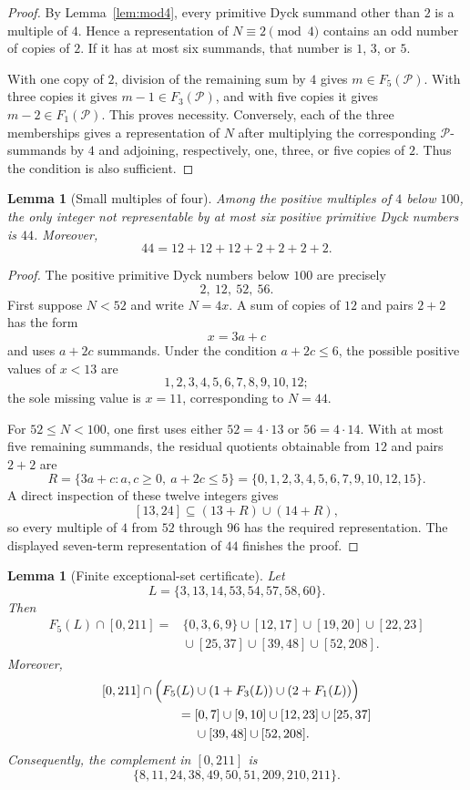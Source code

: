 \documentclass[12pt]{article}
\theoremstyle{plain}
\newtheorem{lemma}[theorem]{Lemma}
\theoremstyle{definition}
\theoremstyle{plain}
\newcommand{\Pset}{\mathcal{P}}
\begin{document}
\begin{proof}
By Lemma~\ref{lem:mod4}, every primitive Dyck summand other than $2$ is
a multiple of $4$.  Hence a representation of $N\equiv2\pmod 4$ contains
an odd number of copies of $2$.  If it has at most six summands, that
number is $1$, $3$, or $5$.

With one copy of $2$, division of the remaining sum by $4$ gives
$m\in F_5(\Pset)$.  With three copies it gives
$m-1\in F_3(\Pset)$, and with five copies it gives
$m-2\in F_1(\Pset)$.  This proves necessity.  Conversely, each of the
three memberships gives a representation of $N$ after multiplying the
corresponding $\Pset$-summands by $4$ and adjoining, respectively, one,
three, or five copies of $2$.  Thus the condition is also sufficient.
\end{proof}

\begin{lemma}[Small multiples of four]\label{lem:smallmultiples}
Among the positive multiples of $4$ below $100$, the only integer not
representable by at most six positive primitive Dyck numbers is $44$.
Moreover,
\[
 44=12+12+12+2+2+2+2.
\]
\end{lemma}

\begin{proof}
The positive primitive Dyck numbers below $100$ are precisely
\[
 2,\ 12,\ 52,\ 56.
\]
First suppose $N<52$ and write $N=4x$.  A sum of copies of $12$ and
pairs $2+2$ has the form
\[
 x=3a+c
\]
and uses $a+2c$ summands.  Under the condition $a+2c\leq6$, the possible
positive values of $x<13$ are
\[
 1,2,3,4,5,6,7,8,9,10,12;
\]
the sole missing value is $x=11$, corresponding to $N=44$.

For $52\leq N<100$, one first uses either $52=4\cdot13$ or
$56=4\cdot14$.  With at most five remaining summands, the residual
quotients obtainable from $12$ and pairs $2+2$ are
\[
 R=\{3a+c:a,c\geq0,\ a+2c\leq5\}
   =\{0,1,2,3,4,5,6,7,9,10,12,15\}.
\]
A direct inspection of these twelve integers gives
\[
 [13,24]\subseteq(13+R)\cup(14+R),
\]
so every multiple of $4$ from $52$ through $96$ has the required
representation.  The displayed seven-term representation of $44$
finishes the proof.
\end{proof}

\begin{lemma}[Finite exceptional-set certificate]\label{lem:finiteexception}
Let
\[
 L=\{3,13,14,53,54,57,58,60\}.
\]
Then
\[
\begin{aligned}
F_5(L)\cap[0,211]
={}&\{0,3,6,9\}\cup[12,17]\cup[19,20]\cup[22,23]\\
 &{}\cup[25,37]\cup[39,48]\cup[52,208].
\end{aligned}
\]
Moreover,
\[
\begin{aligned}
[0,211]\cap\Bigl(F_5(L)&\cup(1+F_3(L))\cup(2+F_1(L))\Bigr)\\
={}&[0,7]\cup[9,10]\cup[12,23]\cup[25,37]\\
 &{}\cup[39,48]\cup[52,208].
\end{aligned}
\]
Consequently, the complement in $[0,211]$ is
\[
 \{8,11,24,38,49,50,51,209,210,211\}.
\]
\end{lemma}
\end{document}
